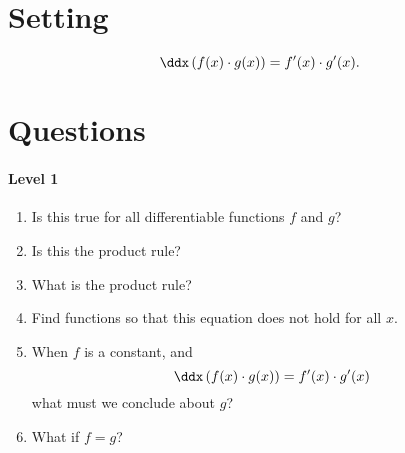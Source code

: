 \documentclass{ximera}
\begin{document}
\section{Setting}

\vfil

\[
\ddx\left(f(x) \cdot g(x)\right) = f'(x)\cdot g'(x).
\]

\vfil

\vfil

\newpage


\section{Questions}

\paragraph{Level 1}
\begin{enumerate}
\item Is this true for all differentiable functions $f$ and $g$?
\item Is this the product rule?
\item What is the product rule?
\item Find functions so that this equation does not hold for all $x$.
\item When $f$ is a constant, and
  \[
  \ddx\left(f(x)\cdot g(x)\right) = f'(x)\cdot g'(x)
  \]
  what must we conclude about $g$?
\item What if $f = g$?
\end{enumerate}
\end{document}

